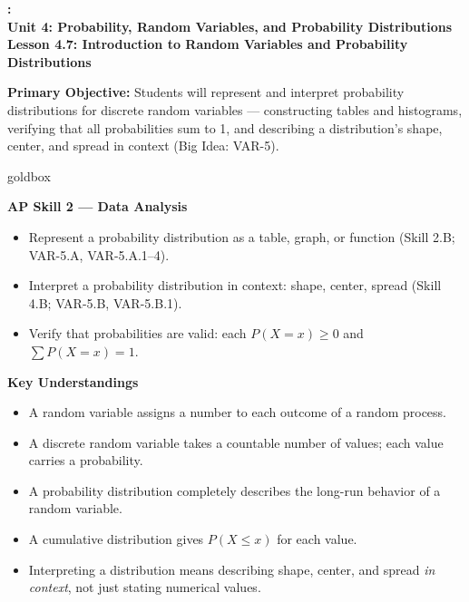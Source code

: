 \documentclass[10pt]{article}
\newcommand{\UnitNumberName}{Unit 4: Probability, Random Variables, and Probability Distributions \quad}
\newcommand{\LessonNumberName}{Lesson 4.7: Introduction to Random Variables and Probability Distributions}
\begin{document}
\begin{center}
    {\Large\bfseries \CourseName: \SchoolYear \\
    {\small\bfseries \UnitNumberName \LessonNumberName}}
\end{center}

\begin{tcolorbox}[colback=sky, colframe=navy, boxrule=0.9pt, arc=2mm,
    left=2mm, right=2mm, top=1.5mm, bottom=1.5mm]
    \textbf{Primary Objective:} Students will represent and interpret probability distributions
    for discrete random variables --- constructing tables and histograms, verifying that all
    probabilities sum to 1, and describing a distribution's shape, center, and spread in context
    (Big Idea: VAR-5).
\end{tcolorbox}

\renewcommand{\arraystretch}{1.6}
\begin{skillbox}{goldbox}
\begin{minipage}[t]{0.48\linewidth}
    \textbf{AP Skill 2 --- Data Analysis}
    \begin{itemize}
        \item Represent a probability distribution as a table, graph, or function (Skill 2.B;
              VAR-5.A, VAR-5.A.1--4).
        \item Interpret a probability distribution in context: shape, center, spread (Skill 4.B;
              VAR-5.B, VAR-5.B.1).
        \item Verify that probabilities are valid: each $P(X=x) \ge 0$ and $\sum P(X=x) = 1$.
    \end{itemize}
\end{minipage}
\hfill
\begin{minipage}[t]{0.48\linewidth}
    \textbf{Key Understandings}
    \begin{itemize}
        \item A random variable assigns a number to each outcome of a random process.
        \item A discrete random variable takes a countable number of values; each value carries
              a probability.
        \item A probability distribution completely describes the long-run behavior of a random
              variable.
        \item A cumulative distribution gives $P(X \le x)$ for each value.
        \item Interpreting a distribution means describing shape, center, and spread
              \emph{in context}, not just stating numerical values.
    \end{itemize}
\end{minipage}
\end{skillbox}
\end{document}
